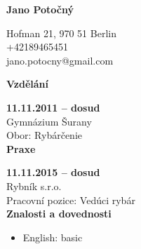 \documentclass[12pt, a4paper]{article}
\begin{document}
        \begin{center} \huge \bfseries Jano Potočný\end{center}
Hofman 21, 970 51 Berlin\\
+42189465451\\
jano.potocny@gmail.com\\

{\hrulefill \large \bfseries Vzdělání\hrulefill}

\vspace{0.2cm}
{\bfseries 11.11.2011 -- dosud}\\Gymnázium Šurany\\Obor: Rybárčenie\\

{\hrulefill \large \bfseries Praxe\hrulefill}

\vspace{0.2cm}
{\bfseries 11.11.2015 -- dosud}\\Rybník s.r.o.\\ Pracovní pozice: Vedúci rybár\\

{\hrulefill \large \bfseries Znalosti a dovednosti\hrulefill}

\vspace{0.2cm}{\bfseries Jazykové znalosti:}
    \begin{itemize}[leftmargin=0.5cm,topsep=0cm]
    \setlength\itemsep{-0.2cm}\item English: basic\end{itemize}
\end{document}
